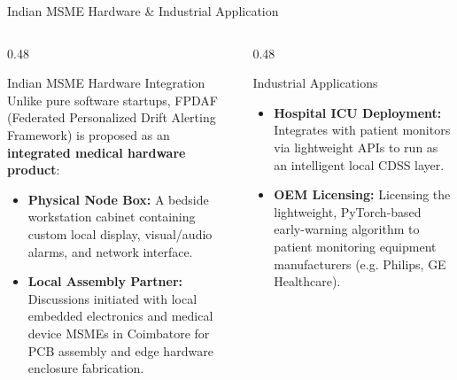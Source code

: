 \documentclass[aspectratio=169, 11pt]{beamer}
\begin{document}
\begin{frame}{Indian MSME Hardware \& Industrial Application}
    \begin{columns}[t]
        \begin{column}{0.48\textwidth}
            \begin{block}{\textcolor{neonCyan}{Indian MSME Hardware Integration}}
                \scriptsize
                Unlike pure software startups, FPDAF (Federated Personalized Drift Alerting Framework) is proposed as an \textbf{integrated medical hardware product}:
                \begin{itemize}
                    \item \textbf{Physical Node Box:} A bedside workstation cabinet containing custom local display, visual/audio alarms, and network interface.
                    \item \textbf{Local Assembly Partner:} Discussions initiated with local embedded electronics and medical device MSMEs in Coimbatore for PCB assembly and edge hardware enclosure fabrication.
                \end{itemize}
            \end{block}
        \end{column}
        
        \begin{column}{0.48\textwidth}
            \begin{block}{\textcolor{neonTeal}{Industrial Applications}}
                \scriptsize
                \begin{itemize}
                    \item \textbf{Hospital ICU Deployment:} Integrates with patient monitors via lightweight APIs to run as an intelligent local CDSS layer.
                    \item \textbf{OEM Licensing:} Licensing the lightweight, PyTorch-based early-warning algorithm to patient monitoring equipment manufacturers (e.g. Philips, GE Healthcare).
                \end{itemize}
            \end{block}
        \end{column}
    \end{columns}
\end{frame}
\end{document}
